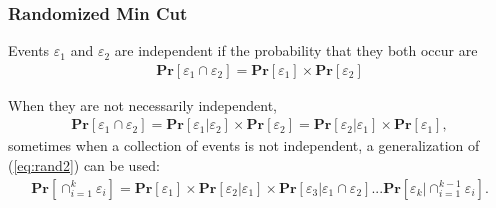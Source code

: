 
\subsubsection{Randomized Min Cut}

Events $\varepsilon_1$ and $\varepsilon_2$ are independent if the probability that they both occur are
\begin{align}
  \mathbf{Pr}[\varepsilon_1 \cap  \varepsilon_2] = \mathbf{Pr}[\varepsilon_1] \times \mathbf{Pr}[\varepsilon_2]
\end{align}

When they are not necessarily independent,
\begin{align}
  \mathbf{Pr}[\varepsilon_1 \cap \varepsilon_2] = \mathbf{Pr}[\varepsilon_1|\varepsilon_2] \times
  \mathbf{Pr}[\varepsilon_2] = \mathbf{Pr}[\varepsilon_2|\varepsilon_1] \times \mathbf{Pr}[\varepsilon_1],
  \label{eq:rand2}
\end{align}
sometimes when a collection of events is not independent, a generalization of (\ref{eq:rand2}) can be used:
\begin{align}
  \mathbf{Pr}[\cap^k_{i=1}\varepsilon_i] = \mathbf{Pr}[\varepsilon_1] \times \mathbf{Pr}[\varepsilon_2|\varepsilon_1]
  \times \mathbf{Pr}[\varepsilon_3|\varepsilon_1 \cap \varepsilon_2] ... \mathbf{Pr}[\varepsilon_k|\cap^{k-1}_{i=1}\varepsilon_i].
\end{align}


